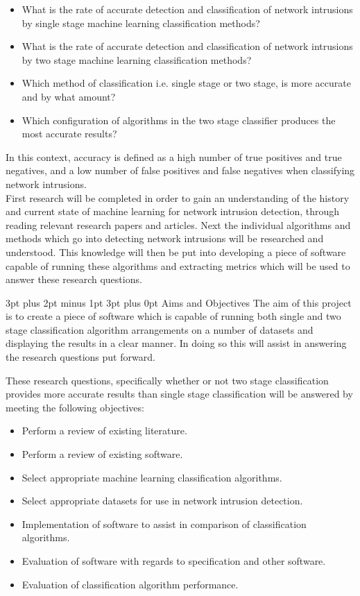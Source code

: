 \documentclass[12pt,a4paper]{article}
\makeatletter
\renewcommand\subsection{\@startsection {subsection}{1}{2mm} %
                               {3pt plus 2pt minus 1pt} %
                               {3pt plus 0pt} %
                               {\normalfont\bfseries}}
\makeatother
\begin{document}
		\begin{itemize}
			\item What is the rate of accurate detection and classification of network intrusions by single stage machine learning classification methods?
			\item What is the rate of accurate detection and classification of network intrusions by two stage machine learning classification methods?
			\item Which method of classification i.e. single stage or two stage, is more accurate and by what amount?
			\item Which configuration of algorithms in the two stage classifier produces the most accurate results?
		\end{itemize}
		
In this context, accuracy is defined as a high number of true positives and true negatives, and a low number of false positives and false negatives when classifying network intrusions. \\

	First research will be completed in order to gain an understanding of the history and current state of machine learning for network intrusion detection, through reading relevant research papers and articles. Next the individual algorithms and methods which go into detecting network intrusions will be researched and understood. This knowledge will then be put into developing a piece of software capable of running these algorithms and extracting metrics which will be used to answer these research questions.

\subsection{Aims and Objectives}
	The aim of this project is to create a piece of software which is capable of running both single and two stage classification algorithm arrangements on a number of datasets and displaying the results in a clear manner. In doing so this will assist in answering the research questions put forward.

	These research questions, specifically whether or not two stage classification provides more accurate results than single stage classification will be answered by meeting the following objectives:
\begin{itemize}
\item{Perform a review of existing literature.}
\item{Perform a review of existing software.}
\item{Select appropriate machine learning classification algorithms.}
\item{Select appropriate datasets for use in network intrusion detection.}
\item{Implementation of software to assist in comparison of classification algorithms.}
\item{Evaluation of software with regards to specification and other software.}
\item{Evaluation of classification algorithm performance.}
\end{itemize}
\end{document}

